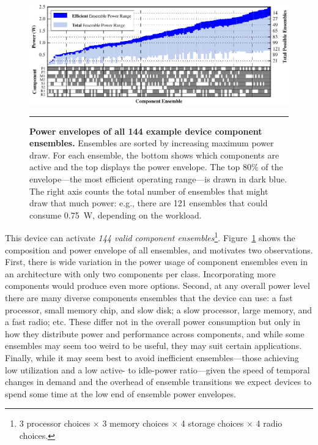 \begin{figure}[t]
\includegraphics{./figures/componentgraph.pdf}

\caption{\small \textbf{Power envelopes of all 144 example device component
ensembles.} Ensembles are sorted by increasing maximum power draw. For each
ensemble, the bottom shows which components are active and the top displays
the power envelope. The top 80\% of the envelope---the most efficient
operating range---is drawn in dark blue. The right axis counts the total
number of ensembles that might draw that much power: e.g., there are 121
ensembles that could consume 0.75~W, depending on the workload.}

\vspace{0.10in}
\hrule
\vspace{-0.20in}
\label{figure-componentgraph}
\end{figure}


This device can activate \textit{144 valid component ensembles}\footnote{3
processor choices $\times$ 3 memory choices $\times$ 4 storage choices
$\times$ 4 radio choices.}. Figure~\ref{figure-componentgraph} shows the
composition and power envelope of all ensembles, and motivates two
observations. First, there is wide variation in the power usage of component
ensembles even in an architecture with only two components per class.
Incorporating more components would produce even more options. Second, at any
overall power level there are many diverse components ensembles that the
device can use: a fast processor, small memory chip, and slow disk; a slow
processor, large memory, and a fast radio; etc. These differ not in the
overall power consumption but only in how they distribute power and
performance across components, and while some ensembles may seem too weird to
be useful, they may suit certain applications. Finally, while it may seem
best to avoid inefficient ensembles---those achieving low utilization and a
low active- to idle-power ratio---given the speed of temporal changes in
demand and the overhead of ensemble transitions we expect devices to spend
some time at the low end of ensemble power envelopes.

